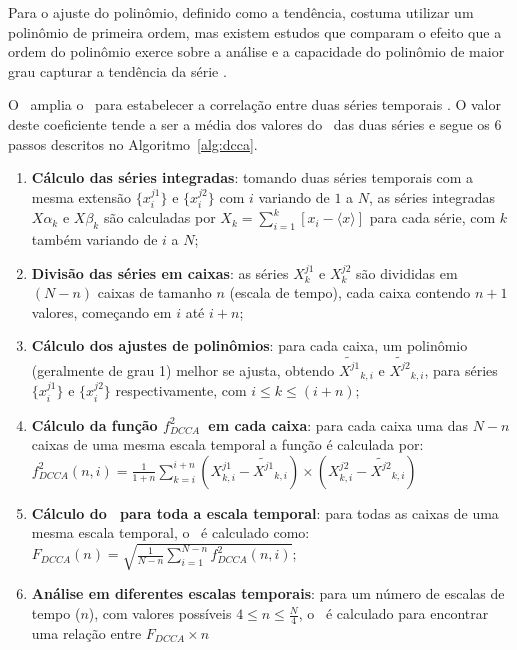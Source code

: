 Para o ajuste do polinômio, definido como a tendência, costuma utilizar um polinômio de primeira ordem, mas existem estudos que comparam o efeito que a ordem do polinômio exerce sobre a análise e a capacidade do polinômio de maior grau capturar a tendência da série \cite{huEffectTrendsDetrended2001}.  

O \dcca~amplia o \dfa~para estabelecer a correlação entre duas séries temporais \cite{Podobnik2008}. O valor deste coeficiente tende a ser a média dos valores do \dfa~das duas séries e segue os 6 passos descritos no Algoritmo~\ref{alg:dcca}.

\begin{algorithm} \caption{\dcca} \label{alg:dcca}
  \begin{enumerate}
    \item \textbf{Cálculo das séries integradas}: tomando duas séries temporais com a mesma extensão $\{x^{j1}_{i}\}$ e $\{x^{j2}_{i}\}$ com $i$ variando de $1$ a $N$,
          as séries integradas $X\alpha_{k}$ e $X\beta_{k}$ são calculadas por
          $X_{k} = \sum_{i=1}^{k}\left[x_{i} - \langle x \rangle \right] $ para cada série, com $k$ também variando de $i$ a $N$;
    \item \textbf{Divisão das séries em caixas}: as séries $X^{j1}_{k}$ e $X^{j2}_{k}$ são divididas em $(N - n)$ caixas de tamanho $n$ (escala de tempo), cada caixa contendo $n + 1$ valores, começando em $i$ até $i + n$;
    \item \textbf{Cálculo dos ajustes de polinômios}: para cada caixa, um polinômio (geralmente de grau 1) melhor se ajusta, obtendo
          $\widetilde{X^{j1}}_{k, i}$ e $\widetilde{X^{j2}}_{k, i}$,
          para séries $\{x^{j1}_{i}\}$ e $\{x^{j2}_{i}\}$ respectivamente,
          com $i \le k \le (i + n)$;
    \item \textbf{Cálculo da função $f_{DCCA}^{2}$~em cada caixa}: para cada caixa uma das $N - n$ caixas de uma mesma escala temporal a função é calculada por:\\[10pt]
     $f_{DCCA}^{2}(n, i) =
            \frac{1}{1+n} \sum_{k=i}^{i + n}(X^{j1}_{k,i}-\widetilde{X^{j1}}_{k, i}) \times (X^{j2}_{k,i}-\widetilde{X^{j2}}_{k, i})$
    \item \textbf{Cálculo do \dcca~para toda a escala temporal}: para todas as caixas de uma mesma escala temporal, o \dcca~é calculado como:\\[10pt]
          $F_{DCCA}(n) = \sqrt{\frac{1}{N - n} \sum_{i=1}^{N-n} f_{DCCA}^{2}(n, i)}$;
    \item \textbf{Análise em diferentes escalas temporais}: para um número de escalas de tempo ($n$), com valores possíveis $4 \le n \le \frac{N}{4}$, o \dcca~é calculado para encontrar uma relação entre $F_{DCCA} \times n$

\end{enumerate}
\end{algorithm}

